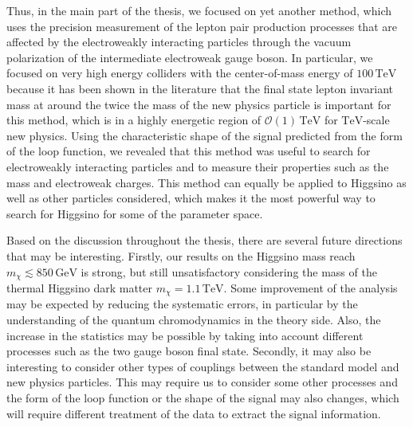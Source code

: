 \documentclass[12pt,twoside,book]{article}
\begin{document}
Thus, in the main part of the thesis, we focused on yet another method, which uses the precision measurement of the lepton pair production processes that are affected by the electroweakly interacting particles through the vacuum polarization of the intermediate electroweak gauge boson.
In particular, we focused on very high energy colliders with the center-of-mass energy of $100\,\mathrm{TeV}$ because it has been shown in the literature that the final state lepton invariant mass at around the twice the mass of the new physics particle is important for this method, which is in a highly energetic region of $\mathcal{O}(1)\,\mathrm{TeV}$ for $\mathrm{TeV}$-scale new physics.
Using the characteristic shape of the signal predicted from the form of the loop function, we revealed that this method was useful to search for electroweakly interacting particles and to measure their properties such as the mass and electroweak charges.
This method can equally be applied to Higgsino as well as other particles considered, which makes it the most powerful way to search for Higgsino for some of the parameter space.

Based on the discussion throughout the thesis, there are several future directions that may be interesting.
Firstly, our results on the Higgsino mass reach $m_\chi \lesssim 850\, \mathrm{GeV}$ is strong, but still unsatisfactory considering the mass of the thermal Higgsino dark matter $m_\chi = 1.1\,\mathrm{TeV}$.
Some improvement of the analysis may be expected by reducing the systematic errors, in particular by the understanding of the quantum chromodynamics in the theory side.
Also, the increase in the statistics may be possible by taking into account different processes such as the two gauge boson final state.
Secondly, it may also be interesting to consider other types of couplings between the standard model and new physics particles.
This may require us to consider some other processes and the form of the loop function or the shape of the signal may also changes, which will require different treatment of the data to extract the signal information.


\clearpage


\begin{appendices}



\clearpage



\clearpage



\clearpage



\clearpage



\end{appendices}

\clearpage



\end{document}
